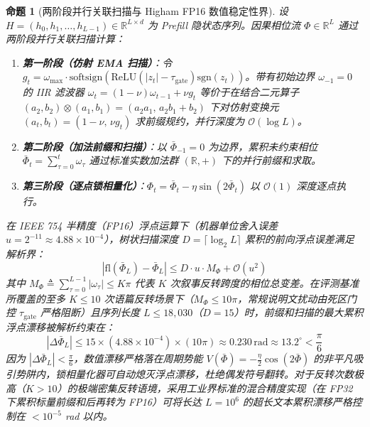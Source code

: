 \documentclass[11pt,a4paper]{article}
\newtheorem{proposition}[theorem]{命题}
\theoremstyle{definition}
\begin{document}
\begin{proposition}[两阶段并行关联扫描与 Higham FP16 数值稳定性界]
\label{prop:associative_scan}
设 $H = (h_0, h_1, \dots, h_{L-1}) \in \mathbb{R}^{L \times d}$ 为 Prefill 隐状态序列。因果相位流 $\Phi \in \mathbb{R}^L$ 通过两阶段并行关联扫描计算：
\begin{enumerate}
    \item \textbf{第一阶段（仿射 EMA 扫描）}：令 $g_t = \omega_{\max} \cdot \mathrm{softsign}(\mathrm{ReLU}(|z_t| - \tau_{\text{gate}})\mathrm{sgn}(z_t))$。带有初始边界 $\omega_{-1}=0$ 的 IIR 滤波器 $\omega_t = (1-\nu)\omega_{t-1} + \nu g_t$ 等价于在结合二元算子 $(a_2, b_2) \otimes (a_1, b_1) = (a_2 a_1, \, a_2 b_1 + b_2)$ 下对仿射变换元 $(a_t, b_t) = (1-\nu, \, \nu g_t)$ 求前缀规约，并行深度为 $\mathcal{O}(\log L)$。
    \item \textbf{第二阶段（加法前缀和扫描）}：以 $\bar{\Phi}_{-1}=0$ 为边界，累积未约束相位 $\bar{\Phi}_t = \sum_{\tau=0}^t \omega_\tau$ 通过标准实数加法群 $(\mathbb{R}, +)$ 下的并行前缀和求取。
    \item \textbf{第三阶段（逐点锁相量化）}：$\Phi_t = \bar{\Phi}_t - \eta\sin(2\bar{\Phi}_t)$ 以 $\mathcal{O}(1)$ 深度逐点执行。
\end{enumerate}
在 IEEE 754 半精度（FP16）浮点运算下（机器单位舍入误差 $u = 2^{-11} \approx 4.88 \times 10^{-4}$），树状扫描深度 $D = \lceil \log_2 L \rceil$ 累积的前向浮点误差满足解析界：
\begin{equation}
|\mathrm{fl}(\bar{\Phi}_L) - \bar{\Phi}_L| \le D \cdot u \cdot M_\Phi + \mathcal{O}(u^2)
\end{equation}
其中 $M_\Phi \triangleq \sum_{\tau=0}^{L-1} |\omega_\tau| \le K\pi$ 代表 $K$ 次叙事反转跨度的相位总变差。在评测基准所覆盖的至多 $K \le 10$ 次语篇反转场景下（$M_\Phi \le 10\pi$，常规说明文扰动由死区门控 $\tau_{\text{gate}}$ 严格阻断）且序列长度 $L \le 18,030$（$D = 15$）时，前缀和扫描的最大累积浮点漂移被解析约束在：
\begin{equation}
|\Delta \bar{\Phi}_L| \le 15 \times (4.88 \times 10^{-4}) \times (10\pi) \approx 0.230\,\text{rad} \approx 13.2^\circ < \frac{\pi}{6}
\end{equation}
因为 $|\Delta \bar{\Phi}_L| < \frac{\pi}{6}$，数值漂移严格落在周期势能 $V(\bar{\Phi}) = -\frac{\eta}{2}\cos(2\bar{\Phi})$ 的非平凡吸引势阱内，锁相量化器可自动熄灭浮点漂移，杜绝偶发符号翻转。对于反转次数极高（$K > 10$）的极端密集反转语境，采用工业界标准的混合精度实现（在 FP32 下累积标量前缀和后再转为 FP16）可将长达 $L = 10^6$ 的超长文本累积漂移严格控制在 $< 10^{-5}$ rad 以内。
\end{proposition}
\end{document}
